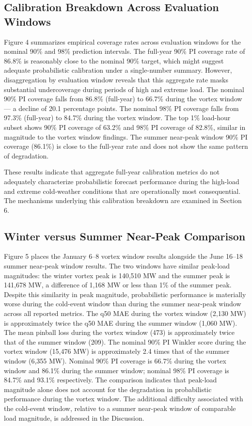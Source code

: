 \documentclass[12pt,a4paper]{article}
\begin{document}
\subsection{Calibration Breakdown Across Evaluation Windows}
Figure 4 summarizes empirical coverage rates across evaluation windows for the nominal 90\% and 98\% prediction intervals. The full-year 90\% PI coverage rate of 86.8\% is reasonably close to the nominal 90\% target, which might suggest adequate probabilistic calibration under a single-number summary. However, disaggregation by evaluation window reveals that this aggregate rate masks substantial undercoverage during periods of high and extreme load.
The nominal 90\% PI coverage falls from 86.8\% (full-year) to 66.7\% during the vortex window --- a decline of 20.1 percentage points. The nominal 98\% PI coverage falls from 97.3\% (full-year) to 84.7\% during the vortex window. The top 1\% load-hour subset shows 90\% PI coverage of 63.2\% and 98\% PI coverage of 82.8\%, similar in magnitude to the vortex window findings. The summer near-peak window 90\% PI coverage (86.1\%) is close to the full-year rate and does not show the same pattern of degradation.


These results indicate that aggregate full-year calibration metrics do not adequately characterize probabilistic forecast performance during the high-load and extreme cold-weather conditions that are operationally most consequential. The mechanisms underlying this calibration breakdown are examined in Section 6.
\subsection{Winter versus Summer Near-Peak Comparison}
Figure 5 places the January 6–8 vortex window results alongside the June 16–18 summer near-peak window results. The two windows have similar peak-load magnitudes: the winter vortex peak is 140,510 MW and the summer peak is 141,678 MW, a difference of 1,168 MW or less than 1\% of the summer peak. Despite this similarity in peak magnitude, probabilistic performance is materially worse during the cold-event window than during the summer near-peak window across all reported metrics.
The q50 MAE during the vortex window (2,130 MW) is approximately twice the q50 MAE during the summer window (1,060 MW). The mean pinball loss during the vortex window (473) is approximately twice that of the summer window (209). The nominal 90\% PI Winkler score during the vortex window (15,476 MW) is approximately 2.4 times that of the summer window (6,355 MW). Nominal 90\% PI coverage is 66.7\% during the vortex window and 86.1\% during the summer window; nominal 98\% PI coverage is 84.7\% and 93.1\% respectively.
The comparison indicates that peak-load magnitude alone does not account for the degradation in probabilistic performance during the vortex window. The additional difficulty associated with the cold-event window, relative to a summer near-peak window of comparable load magnitude, is addressed in the Discussion.
\end{document}
